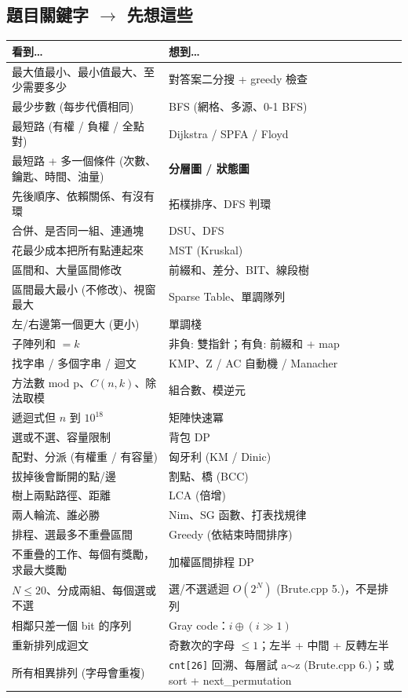\documentclass[portrait, 8pt, a4paper, oneside, twocolumn]{extarticle}
\begin{document}
\subsection{題目關鍵字 $\rightarrow$ 先想這些}
\begin{tabular}{@{}L{3.5cm}L{5.0cm}@{}}
\hline
看到… & 想到… \\ \hline
最大值最小、最小值最大、至少需要多少 & 對答案二分搜 + greedy 檢查 \\
最少步數 (每步代價相同) & BFS (網格、多源、0-1 BFS) \\
最短路 (有權 / 負權 / 全點對) & Dijkstra / SPFA / Floyd \\
最短路 + 多一個條件 (次數、鑰匙、時間、油量) & \textbf{分層圖 / 狀態圖} \\
先後順序、依賴關係、有沒有環 & 拓樸排序、DFS 判環 \\
合併、是否同一組、連通塊 & DSU、DFS \\
花最少成本把所有點連起來 & MST (Kruskal) \\
區間和、大量區間修改 & 前綴和、差分、BIT、線段樹 \\
區間最大最小 (不修改)、視窗最大 & Sparse Table、單調隊列 \\
左/右邊第一個更大 (更小) & 單調棧 \\
子陣列和 $= k$ & 非負: 雙指針；有負: 前綴和 + map \\
找字串 / 多個字串 / 迴文 & KMP、Z / AC 自動機 / Manacher \\
方法數 mod p、$C(n,k)$、除法取模 & 組合數、模逆元 \\
遞迴式但 $n$ 到 $10^{18}$ & 矩陣快速冪 \\
選或不選、容量限制 & 背包 DP \\
配對、分派 (有權重 / 有容量) & 匈牙利 (KM / Dinic) \\
拔掉後會斷開的點/邊 & 割點、橋 (BCC) \\
樹上兩點路徑、距離 & LCA (倍增) \\
兩人輪流、誰必勝 & Nim、SG 函數、打表找規律 \\
排程、選最多不重疊區間 & Greedy (依結束時間排序) \\
不重疊的工作、每個有獎勵，求最大獎勵 & 加權區間排程 DP \\
$N \le 20$、分成兩組、每個選或不選 & 選/不選遞迴 $O(2^N)$ (Brute.cpp 5.)，不是排列 \\
相鄰只差一個 bit 的序列 & Gray code：$i \oplus (i \gg 1)$ \\
重新排列成迴文 & 奇數次的字母 $\le 1$；左半 + 中間 + 反轉左半 \\
所有相異排列 (字母會重複) & \texttt{cnt[26]} 回溯、每層試 a$\sim$z (Brute.cpp 6.)；或 sort + next\_permutation \\
 \hline
\end{tabular}
\end{document}
